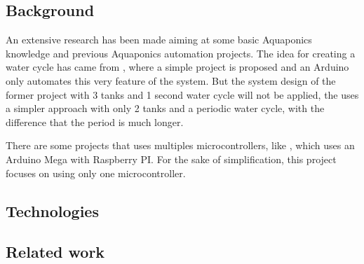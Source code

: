 \subsection{Background}

An extensive research has been made aiming at some basic Aquaponics knowledge and previous Aquaponics automation projects.
The idea for creating a water cycle has came from \cite{simpleArduinoAquaponics},
where a simple project is proposed and an Arduino only automates this very feature of the system.
But the system design of the former project with 3 tanks and 1 second water cycle will not be applied,
the \cite{Kretzinger2015} uses a simpler approach with only 2 tanks and a periodic water cycle,
with the difference that the period is much longer.

There are some projects that uses multiples microcontrollers,
like \cite{GarethColeman2014},
which uses an Arduino Mega with Raspberry PI.
For the sake of simplification,
this project focuses on using only one microcontroller.

\subsection{Technologies}
\subsection{Related work}
